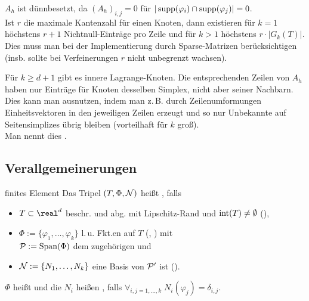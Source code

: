 \linie

\begin{Bem}
    $A_h$ ist dünnbesetzt,
    da $(A_h)_{i,j} = 0$ für $|\supp(\varphi_i) \cap \supp(\varphi_j)| = 0$.\\
    Ist $r$ die maximale Kantenzahl für einen Knoten,
    dann existieren für $k = 1$ höchstens $r + 1$ Nichtnull-Einträge pro Zeile und
    für $k > 1$ höchstens $r \cdot |G_k(T)|$.\\
    Dies muss man bei der Implementierung durch Sparse-Matrizen berücksichtigen
    (insb. sollte bei Verfeinerungen $r$ nicht unbegrenzt wachsen).
\end{Bem}

\begin{Bem}
    Für $k \ge d+1$ gibt es innere Lagrange-Knoten.
    Die entsprechenden Zeilen von $A_h$ haben nur Einträge für Knoten desselben Simplex,
    nicht aber seiner Nachbarn.
    Dies kann man ausnutzen, indem man z.\,B. durch Zeilenumformungen Einheitsvektoren
    in den jeweiligen Zeilen erzeugt und so nur Unbekannte auf Seitensimplizes übrig bleiben
    (vorteilhaft für $k$ groß).\\
    Man nennt dies .
\end{Bem}

\pagebreak

\subsection{%
    Verallgemeinerungen%
}

\begin{Def}{finites Element}
    Das Tripel $(T, \Phi, \N)$ heißt , falls
    \begin{itemize}
        \item
        $T \subset \real^d$ beschr. und abg. mit Lipschitz-Rand und $\interior(T) \not= \emptyset$
        (),

        \item
        $\Phi := \{\varphi_1, \dotsc, \varphi_k\}$ l.\,u. Fkt.en auf $T$
        (, ) mit\\
        $\P := \Span(\Phi)$ dem zugehörigen  und

        \item
        $\N := \{N_1, \dotsc, N_k\}$
        eine Basis von $\P'$ ist ().
    \end{itemize}
    $\Phi$ heißt  und die $N_i$ heißen ,
    falls $\forall_{i,j=1,\dotsc,k}\; N_i(\varphi_j) = \delta_{i,j}$.
\end{Def}

